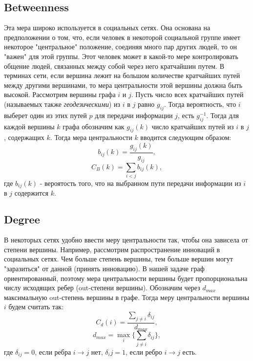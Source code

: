 \subsection{Betweenness \cite{betweenness}}
Эта мера широко используется в социальных сетях. Она основана на предположении о том, что, если человек в некоторой социальной группе имеет некоторое "центральное" положение, соединяя много пар других людей, то он "важен" для этой группы. Этот человек может в какой-то мере контролировать общение людей, связанных между собой через него кратчайшин путем. В терминах сети, если вершина лежит на большом количестве кратчайших путей между другими вершинами, то мера центральности этой вершины должна быть высокой. Рассмотрим вершины графа $i$ и $j$. Пусть число всех кратчайших путей (называемых также \textit{геодезическими}) из $i$ в $j$ равно $g_{ij}$. Тогда вероятность, что $i$ выберет один из этих путей $p$ для передачи информации $j$, есть $g_{ij}^{-1}$. Тогда для каждой вершины $k$ графа обозначим как $g_{ij}(k)$ число кратчайших путей из $i$ в $j$, содержащих $k$. Тогда мера центральности $k$ вводится следующим образом:
	\begin{equation}
	b_{ij}(k) = \frac{g_{ij}(k)}{g_{ij}},
	\end{equation}
	\begin{equation}
	C_B(k) = \sum_{i<j}b_{ij}(k),
	\end{equation}
	где $b_{ij}(k)$ - вероятость того, что на выбранном пути передачи информации из $i$ в $j$ содержится $k$. 
	
\subsection{Degree}
В некоторых сетях удобно ввести меру центральности так, чтобы она зависела от степени вершины. Например, рассмотрим распространение инноваций в социальных сетях. Чем больше степень вершины, тем больше вершин могут "заразиться" от данной (принять инновацию). В нашей задаче граф ориентированный, поэтому мера центральности вершины будет пропорциональна числу исходящих ребер (out-степени вершины). Обозначим через $d_{max}$ максимальную out-степень вершины в графе. Тогда меру центральности вершины $i$ будем считать так:
	\begin{equation}
	C_d(i) = \frac{\sum_{j\neq i} \delta_{ij}}{d_{max}},
	\end{equation}
	\begin{equation}
	d_{max} = \max_i\{\sum_{j\neq i}\delta_{ij}\},
	\end{equation}
	где $\delta_{ij}=0$, если ребра $i\rightarrow j$ нет, $\delta_ij=1$, если ребро $i \rightarrow j$ есть.\\
	
